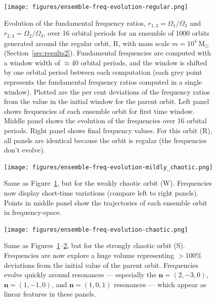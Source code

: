 \documentclass[letterpaper,12pt,preprint]{aastex}
\newcommand{\msun}{\ensuremath{\mathrm{M}_\odot}}
\newcommand{\bs}[1]{\boldsymbol{#1}}
\begin{document}
\clearpage
\begin{figure}[p]
\begin{center}
\texttt{[image: figures/ensemble-freq-evolution-regular.png]}
\caption{Evolution of the fundamental frequency ratios, $r_{1,3} = \Omega_1 / \Omega_3$ and $r_{2,3} = \Omega_2 / \Omega_3$, over 16 orbital periods for an ensemble of 1000 orbits generated around the regular orbit, R, with mass scale $m=10^4~\msun$ (Section~\ref{sec:results2}). Fundamental frequencies are computed with a window width of $\approx$40 orbital periods, and the window is shifted by one orbital period between each computation (each grey point represents the fundamental frequency ratios computed in a single window). Plotted are the per cent deviations of the frequency ratios from the value in the initial window for the parent orbit. Left panel shows frequencies of each ensemble orbit for first time window. Middle panel shows the evolution of the frequencies over 16 orbital periods. Right panel shows final frequency values. For this orbit (R), all panels are identical because the orbit is regular (the frequencies don't evolve).} 
\label{fig:regular-ensemble-freq-evolution}
\end{center}
\end{figure}

\clearpage
\begin{figure}[p]
\begin{center}
\texttt{[image: figures/ensemble-freq-evolution-mildly\_chaotic.png]}
\caption{Same as Figure~\ref{fig:regular-ensemble-freq-evolution}, but for the weakly chaotic orbit (W). Frequencies now display short-time variations (compare left to right panels). Points in middle panel show the trajectories of each ensemble orbit in frequency-space.} 
\label{fig:mildly_chaotic-ensemble-freq-evolution}
\end{center}
\end{figure}

\clearpage
\begin{figure}[p]
\begin{center}
\texttt{[image: figures/ensemble-freq-evolution-chaotic.png]}
\caption{Same as Figures~\ref{fig:regular-ensemble-freq-evolution}--\ref{fig:mildly_chaotic-ensemble-freq-evolution}, but for the strongly chaotic orbit (S). Frequencies are now explore a huge volume representing $>$100\% deviations from the initial value of the parent orbit. Frequencies evolve quickly around resonances --- especially the $\bs{n}=(2,-3,0)$, $\bs{n}=(1,-1,0)$, and $\bs{n}=(1,0,1)$ resonances --- which appear as linear features in these panels.} 
\label{fig:chaotic-ensemble-freq-evolution}
\end{center}
\end{figure}
\end{document}
